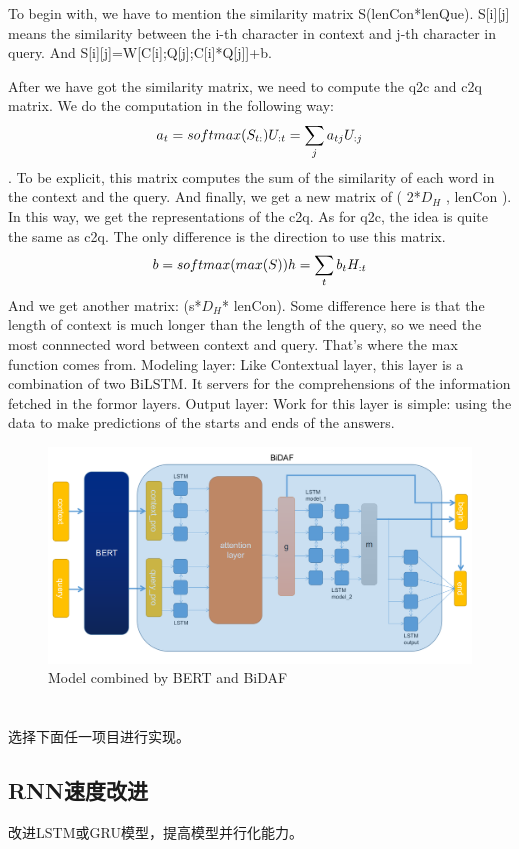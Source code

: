 \documentclass{article}
\begin{document}
To begin with, we have to mention the similarity matrix S(lenCon*lenQue). S[i][j] means the similarity between the i-th character in context and j-th character in query. And S[i][j]=W[C[i];Q[j];C[i]*Q[j]]+b.

After we have got the similarity matrix, we need to compute the q2c and c2q matrix. We do the computation in the following way: $$a_t=softmax(S_{t:})\\U_{:t}=\sum_{j}a_{tj}U_{:j}$$. To be explicit, this matrix computes the sum of the similarity of each word in the context and the query. And finally, we get a new matrix of ( 2*$D_H$ , lenCon ). In this way, we get the representations of the c2q.
As for q2c, the idea is quite the same as c2q. The only difference is the direction to use this matrix. $$b=softmax(max(S))\\h=\sum_tb_tH_{:t}$$
And we get another matrix: (s*$D_H$* lenCon). Some difference here is that the length of context is much longer than the length of the query, so we need the most connnected word between context and query. That's where the max function comes from.
Modeling layer: Like Contextual layer, this layer is a combination of two BiLSTM. It servers for the comprehensions of the information fetched in the formor layers. 
Output layer: Work for this layer is simple: using the data to make predictions of the starts and ends of the answers.
\begin{figure}[h]
	\centering
	\includegraphics[scale=0.3 ]{Model.png}
	\caption{Model combined by BERT and BiDAF}
\end{figure}
\section{}

选择下面任一项目进行实现。

\subsection{RNN速度改进}
改进LSTM或GRU模型，提高模型并行化能力。
\end{document}

